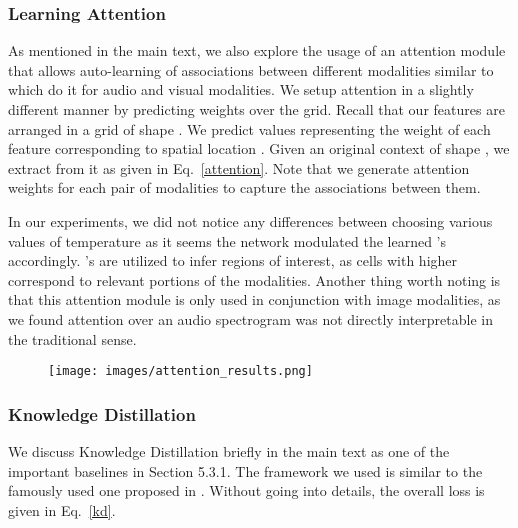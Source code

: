 \documentclass[final]{cvpr}
\begin{document}
\subsubsection*{Learning Attention}

As mentioned in the main text, we also explore the usage of an attention module that allows auto-learning of associations between different modalities similar to \cite{multisensory2018} which do it for audio and visual modalities. We setup attention in a slightly different manner by predicting weights over the grid. Recall that our features are arranged in a grid of shape . We predict  values  representing the weight of each feature corresponding to spatial location . Given an original context  of shape , we extract  from it as given in Eq.~\eqref{attention}. Note that we generate attention weights for each pair of modalities to capture the associations between them.

In our experiments, we did not notice any differences between choosing various values of temperature as it seems the network modulated the learned 's accordingly. 's are utilized to infer regions of interest, as cells with higher  correspond to relevant portions of the modalities. Another thing worth noting is that this attention module is only used in conjunction with image modalities, as we found attention over an audio spectrogram was not directly interpretable in the traditional sense.

\begin{figure}[t]
\begin{center}
    \centering
    \texttt{[image: images/attention\_results.png]}
    \label{intuition}
    \centering
\end{center}
\end{figure}

\subsubsection*{Knowledge Distillation}

We discuss Knowledge Distillation briefly in the main text as one of the important baselines in Section 5.3.1. The framework we used is similar to the famously used one proposed in \cite{hinton2015distilling}. Without going into details, the overall loss is given in Eq.~\eqref{kd}.
\end{document}

